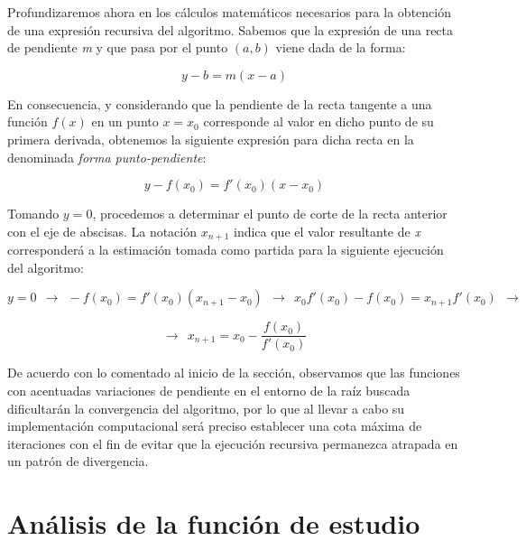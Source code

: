 \documentclass{beamer}
\begin{document}
\begin{frame}

Profundizaremos ahora en los cálculos matemáticos necesarios para la obtención de una
expresión recursiva del algoritmo. Sabemos que la expresión de una recta de pendiente 
\emph{m} y que pasa por el punto $(a, b)$ viene dada de la forma:

$$ y - b = m (x - a)$$

En consecuencia, y considerando que la pendiente de la recta tangente a una función $f(x)$
en un punto $x = x_{0}$ corresponde al valor en dicho punto de su primera derivada, obtenemos 
la siguiente expresión para dicha recta en la denominada \emph{forma punto-pendiente}:

$$y - f(x_{0}) = f'(x_{0}) (x - x_{0})$$

\end{frame}

\begin{frame}

Tomando $y = 0$, procedemos a determinar el punto de corte de la recta anterior con el eje de
abscisas. La notación $x_{n+1}$ indica que el valor resultante de \emph{x} corresponderá a la
estimación tomada como partida para la siguiente ejecución del algoritmo:


$$y = 0 \ \ \to \ \ -f(x_{0}) = f'(x_{0}) (x_{n+1} - x_{0}) \ \ \to \ \ x_{0} f'(x_{0}) - f(x_{0}) 
= x_{n+1} f'(x_{0}) \ \ \to $$

$$\to \ \ x_{n+1} = x_{0} - \frac{f(x_{0})}{f'(x_{0})}$$

De acuerdo con lo comentado al inicio de la sección, observamos que las funciones con acentuadas
variaciones de pendiente en el entorno de la raíz buscada dificultarán la convergencia del algoritmo,
por lo que al llevar a cabo su implementación computacional será preciso establecer una cota máxima
de iteraciones con el fin de evitar que la ejecución recursiva permanezca atrapada en un patrón
de divergencia.

\end{frame}


\section{Análisis de la función de estudio}
\end{document}
